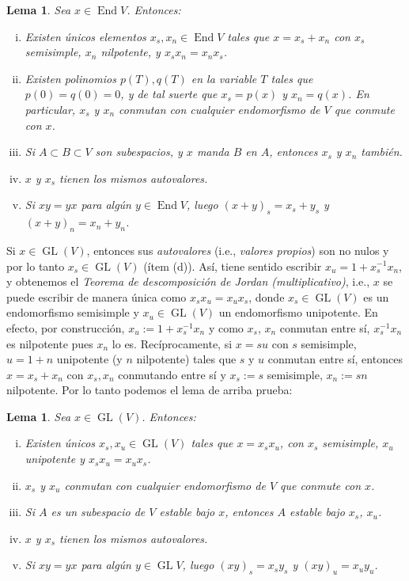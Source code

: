 \documentclass[spanish,10pt]{amsart}
\newtheorem{lemma}[theorem]{Lema}
\theoremstyle{definition}
\theoremstyle{remark}
\numberwithin{equation}{section}
\begin{document}
\begin{lemma}
Sea $x \in \operatorname {End} V$. Entonces:
\begin{enumerate}[(i)]
\item Existen únicos elementos $x_s, x_n \in \operatorname{End} V$ tales que $x = x_s + x_n$ con $x_s$ semisimple, $x_n$ nilpotente, y $x_s x_n = x_n x_s$.
\item Existen polinomios $p(T), q(T)$ en la variable $T$ tales que $p(0) = q(0) = 0$, y de tal suerte que $x_s = p(x)$ y $x_n = q(x)$. En particular, $x_s$ y $x_n$ conmutan con cualquier endomorfismo de $V$ que conmute con $x$.
\item Si $A \subset B \subset V$ son subespacios, y $x$ manda $B$ en $A$, entonces $x_s$ y $x_n$ también.
\item $x$ y $x_s$ tienen los mismos autovalores.
\item Si $xy = yx$ para algún $y \in \operatorname{End} V$, luego $(x+y)_s = x_s + y_s$ y $(x + y)_n = x_n + y_n$.
\end{enumerate}
\end{lemma}

Si $x \in \operatorname{GL} (V)$, entonces sus \textit{autovalores} (i.e., \textit{valores propios}) son no nulos y por lo tanto $x_s \in \operatorname{GL} (V)$ (ítem (d)). Así, tiene sentido escribir $x_u = 1 + x_s^{-1} x_n$, y obtenemos el \textit{Teorema de descomposición de Jordan (multiplicativo)}, i.e., $x$ se puede escribir de manera única como $x_s x_u = x_u x_s$, donde $x_s \in \operatorname{GL} (V)$ es un endomorfismo semisimple y $x_u \in \operatorname{GL}(V)$ un endomorfismo unipotente. En efecto, por construcción, $x_u := 1 + x_s^{-1} x_n$ y como $x_s$, $x_n$ conmutan entre sí, $x_s^{-1} x_n$ es nilpotente pues $x_n$ lo es. Recíprocamente, si $x = s u$ con $s$ semisimple, $u=1 + n$ unipotente (y $n$ nilpotente) tales que $s$ y $u$ conmutan entre sí, entonces $x = x_s + x_n$ con $x_s,x_n$ conmutando entre sí y $x_s := s$ semisimple, $x_n := s n$ nilpotente. Por lo tanto podemos el lema de arriba prueba:

\begin{lemma}
Sea $x \in \operatorname{GL} (V)$. Entonces:
\begin{enumerate}[(i)]
\item Existen únicos $x_s, x_u \in \operatorname{GL} (V)$ tales que $x = x_{s}x_u$, con $x_s$ semisimple, $x_u$ unipotente y $x_s x_u = x_u x_s$.
\item $x_s$ y $x_u$ conmutan con cualquier endomorfismo de $V$ que conmute con $x$.
\item Si $A$ es un subespacio de $V$ estable bajo $x$, entonces $A$ estable bajo $x_s$, $x_u$.
\item $x$ y $x_s$ tienen los mismos autovalores.
\item Si $xy = yx$ para algún $y \in \operatorname{GL} V$, luego $(xy)_s = x_s y_s$ y $(xy)_u = x_u y_u$.
\end{enumerate}
\end{lemma}
\end{document}
